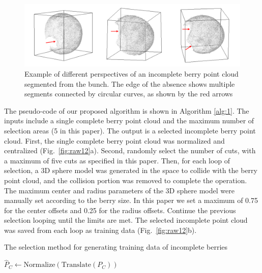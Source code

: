 \documentclass[12pt]{article}
\begin{document}
\begin{figure}[hbt!]
    \centering
    \includegraphics[width=1\textwidth]{figures/Figure8.pdf}
    \caption{Example of different perspectives of an incomplete berry point cloud segmented from the bunch. The edge of the absence shows multiple segments connected by circular curves, as shown by the red arrows}
    \label{fig:raw4}
\end{figure}

The pseudo-code of our proposed algorithm is shown in Algorithm \ref{alg:1}. 
The inputs include a single complete berry point cloud and the maximum number of selection areas (5 in this paper). 
The output is a selected incomplete berry point cloud. First, the single complete berry point cloud was normalized and centralized (Fig.~\ref{fig:raw12}a). 
Second, randomly select the number of cuts, with a maximum of five cuts as specified in this paper. 
Then, for each loop of selection, a 3D sphere model was generated in the space to collide with the berry point cloud, and the collision portion was removed to complete the operation. 
The maximum center and radius parameters of the 3D sphere model were manually set according to the berry size. 
In this paper we set a maximum of 0.75 for the center offsets and 0.25 for the radius offsets. 
Continue the previous selection looping until the limits are met. The selected incomplete point cloud was saved from each loop as training data (Fig.~\ref{fig:raw12}b). 

\begin{algorithm}
    \caption{The selection method for generating training data of incomplete berries}
    \label{alg:1}
    
    $\hat{P}_C \gets \text{Normalize}(\text{Translate}(P_C))$ 
\end{algorithm}
\end{document}
